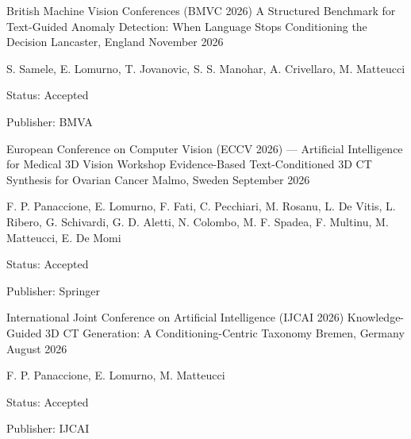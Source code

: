 \begin{cventries}

    \cventry
        {British Machine Vision Conferences (BMVC 2026)} 
        {A Structured Benchmark for Text-Guided Anomaly Detection: When Language Stops Conditioning the Decision}
        {Lancaster, England}
        {November 2026}
        {
        \begin{cvitems}
            \item {S. Samele, E. Lomurno, T. Jovanovic, S. S. Manohar, A. Crivellaro, M. Matteucci}
            \item {Status: Accepted}
            \item {Publisher: BMVA}
        \end{cvitems}
        }

    \vspace{2mm}
    \cventry
        {European Conference on Computer Vision (ECCV 2026) --- Artificial Intelligence for Medical 3D Vision Workshop}
        {Evidence-Based Text-Conditioned 3D CT Synthesis for Ovarian Cancer}
        {Malmo, Sweden}
        {September 2026}
        {
        \begin{cvitems}
            \item {F. P. Panaccione, E. Lomurno, F. Fati, C. Pecchiari, M. Rosanu, L. De Vitis, L. Ribero, G. Schivardi, G. D. Aletti, N. Colombo, M. F. Spadea, F. Multinu, M. Matteucci, E. De Momi}
            \item {Status: Accepted}
            \item {Publisher: Springer}
        \end{cvitems}
        }

    \vspace{2mm}
    \cventry
        {International Joint Conference on Artificial Intelligence (IJCAI 2026)} 
        {Knowledge-Guided 3D CT Generation: A Conditioning-Centric Taxonomy}
        {Bremen, Germany}
        {August 2026}
        {
        \begin{cvitems}
            \item {F. P. Panaccione, E. Lomurno, M. Matteucci}
            \item {Status: Accepted}
            \item {Publisher: IJCAI}
        \end{cvitems}
        }


\end{cventries}
